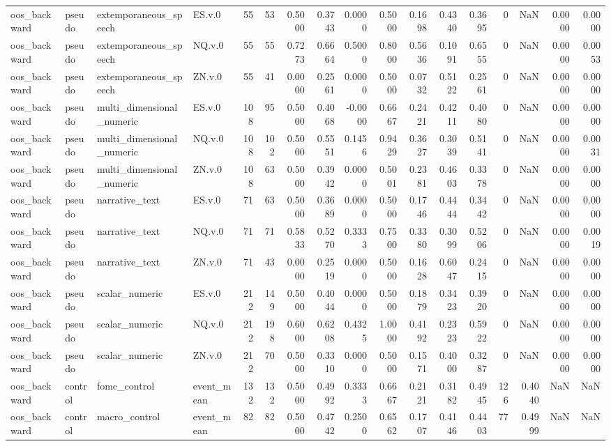 \begin{tabular}{llllrrrrrrrrrrrrr}
oos_backward & pseudo & extemporaneous_speech & ES.v.0 & 55 & 53 & 0.5000 & 0.3743 & 0.0000 & 0.5000 & 0.1698 & 0.4340 & 0.3695 & 0 & NaN & 0.0000 & 0.0000 \\
oos_backward & pseudo & extemporaneous_speech & NQ.v.0 & 55 & 55 & 0.7273 & 0.6664 & 0.5000 & 0.8000 & 0.5636 & 0.1091 & 0.6555 & 0 & NaN & 0.0000 & 0.0053 \\
oos_backward & pseudo & extemporaneous_speech & ZN.v.0 & 55 & 41 & 0.0000 & 0.2561 & 0.0000 & 0.5000 & 0.0732 & 0.5122 & 0.2561 & 0 & NaN & 0.0000 & 0.0000 \\
oos_backward & pseudo & multi_dimensional_numeric & ES.v.0 & 108 & 95 & 0.5000 & 0.4068 & -0.0000 & 0.6667 & 0.2421 & 0.4211 & 0.4080 & 0 & NaN & 0.0000 & 0.0000 \\
oos_backward & pseudo & multi_dimensional_numeric & NQ.v.0 & 108 & 102 & 0.5000 & 0.5551 & 0.1456 & 0.9429 & 0.3627 & 0.3039 & 0.5141 & 0 & NaN & 0.0000 & 0.0031 \\
oos_backward & pseudo & multi_dimensional_numeric & ZN.v.0 & 108 & 63 & 0.5000 & 0.3942 & 0.0000 & 0.5001 & 0.2381 & 0.4603 & 0.3378 & 0 & NaN & 0.0000 & 0.0000 \\
oos_backward & pseudo & narrative_text & ES.v.0 & 71 & 63 & 0.5000 & 0.3689 & 0.0000 & 0.5000 & 0.1746 & 0.4444 & 0.3442 & 0 & NaN & 0.0000 & 0.0000 \\
oos_backward & pseudo & narrative_text & NQ.v.0 & 71 & 71 & 0.5833 & 0.5270 & 0.3333 & 0.7500 & 0.3380 & 0.3099 & 0.5206 & 0 & NaN & 0.0000 & 0.0019 \\
oos_backward & pseudo & narrative_text & ZN.v.0 & 71 & 43 & 0.0000 & 0.2519 & 0.0000 & 0.5000 & 0.1628 & 0.6047 & 0.2415 & 0 & NaN & 0.0000 & 0.0000 \\
oos_backward & pseudo & scalar_numeric & ES.v.0 & 212 & 149 & 0.5000 & 0.4044 & 0.0000 & 0.5000 & 0.1879 & 0.3423 & 0.3920 & 0 & NaN & 0.0000 & 0.0000 \\
oos_backward & pseudo & scalar_numeric & NQ.v.0 & 212 & 198 & 0.6000 & 0.6208 & 0.4325 & 1.0000 & 0.4192 & 0.2323 & 0.5922 & 0 & NaN & 0.0000 & 0.0000 \\
oos_backward & pseudo & scalar_numeric & ZN.v.0 & 212 & 70 & 0.5000 & 0.3310 & 0.0000 & 0.5000 & 0.1571 & 0.4000 & 0.3287 & 0 & NaN & 0.0000 & 0.0000 \\
oos_backward & control & fomc_control & event_mean & 132 & 132 & 0.5000 & 0.4992 & 0.3333 & 0.6667 & 0.2121 & 0.3182 & 0.4945 & 126 & 0.4040 & NaN & NaN \\
oos_backward & control & macro_control & event_mean & 82 & 82 & 0.5000 & 0.4742 & 0.2500 & 0.6562 & 0.1707 & 0.4146 & 0.4403 & 77 & 0.4999 & NaN & NaN \\

\end{tabular}
